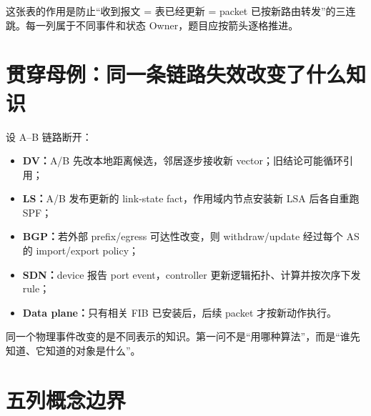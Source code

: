\documentclass[11pt,a4paper]{ctexart}
\newcommand{\kw}[1]{\textbf{\color{deep}#1}}
\begin{document}
这张表的作用是防止“收到报文 = 表已经更新 = packet 已按新路由转发”的三连跳。每一列属于不同事件和状态 Owner，题目应按箭头逐格推进。

\section{贯穿母例：同一条链路失效改变了什么知识}

设 A--B 链路断开：
\begin{itemize}
  \item \kw{DV：}A/B 先改本地距离候选，邻居逐步接收新 vector；旧结论可能循环引用；
  \item \kw{LS：}A/B 发布更新的 link-state fact，作用域内节点安装新 LSA 后各自重跑 SPF；
  \item \kw{BGP：}若外部 prefix/egress 可达性改变，则 withdraw/update 经过每个 AS 的 import/export policy；
  \item \kw{SDN：}device 报告 port event，controller 更新逻辑拓扑、计算并按次序下发 rule；
  \item \kw{Data plane：}只有相关 FIB 已安装后，后续 packet 才按新动作执行。
\end{itemize}
同一个物理事件改变的是不同表示的知识。第一问不是“用哪种算法”，而是“谁先知道、它知道的对象是什么”。

\section{五列概念边界}
\end{document}

